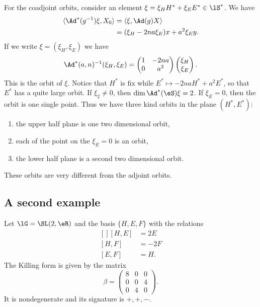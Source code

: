 For the coadjoint orbits, consider an element $\xi=\xi_HH^*+\xi_EE^*\in\lS^*$. We have
\begin{equation}
	\begin{aligned}[]
		\langle \Ad^*(g^{-1})\xi, X_0\rangle &=\langle \xi, \Ad(g)X\rangle \\
			&=(\xi_H-2na\xi_E)x+a^2\xi_Ey.
	\end{aligned}
\end{equation}
If we write $\xi=(\xi_H,\xi_E)$ we have
\begin{equation}
	\Ad^*(a,n)^{-1}(\xi_H,\xi_E)=\begin{pmatrix}
		1	&	-2na	\\
		0	&	a^2
	\end{pmatrix}\begin{pmatrix}
		\xi_H	\\
		\xi_E
	\end{pmatrix}.
\end{equation}
This is the orbit of $\xi$. Notice that $H^*$ is fix while $E^*\mapsto -2na H^*+a^2E^*$, so that $E^*$ has a quite large orbit. If $\xi_2\neq 0$, then $\dim\Ad^*(\eS)\xi=2$. If $\xi_E=0$, then the orbit is one single point. Thus we have three kind orbits in the plane $(H^*,E^*)$:
\begin{enumerate}

	\item
		the upper half plane is one two dimensional orbit,
	\item
		each of the point on the $\xi_E=0$ is an orbit,
	\item
		the lower half plane is a second two dimensional orbit.
\end{enumerate}
These orbits are very different from the adjoint orbits.

\subsection{A second example}

Let $\lG=\SL(2,\eR)$ and the basis $\{ H,E,F \}$ with the relations
\begin{equation}
	\begin{aligned}[]
		[H,E]&=2E\\
		[H,F]&=-2F\\
		[E,F]&=H.
	\end{aligned}
\end{equation}
The Killing form is given by the matrix
\begin{equation}
	\beta=\begin{pmatrix}
		8	&	0	&	0	\\
		0	&	0	&	4	\\
		0	&	4	&	0
	\end{pmatrix}.
\end{equation}
It is nondegenerate and its signature is $+,+,-$.


